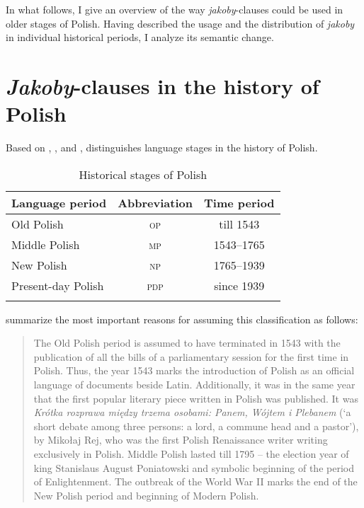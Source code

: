 \documentclass[output=paper]{langsci/langscibook}
\begin{document}
In what follows, I give an overview of the way \emph{jakoby}-clauses could be used in older stages of Polish. Having described the usage and the distribution of \emph{jakoby} in individual historical periods, I analyze its semantic change.

\section{\emph{Jakoby}-clauses in the history of Polish} \label{diachrony}\label{sec:jakoby:3}

Based on \textcite{Klemensiewicz2009}, \textcite{Walczak1999}, and \textcite{Dziubalska-Koaczyk-Walczak2010},  distinguishes language stages in the history of Polish.


\begin{table}[h]
\begin{tabular}{lcc}
\lsptoprule
Language period & Abbreviation & Time period  \\
\midrule
 Old Polish & \textsc{op} & till 1543 \\
 Middle Polish & \textsc{mp} & 1543--1765  \\
 New Polish & \textsc{np} & 1765--1939 \\
 Present-day Polish & \textsc{pdp} & since 1939 \\
\lspbottomrule
\end{tabular}
\caption{Historical stages of Polish\label{tab:jakoby:2}}
\end{table}

\textcite[823]{Dziubalska-Koaczyk-Walczak2010} summarize the most important reasons for assuming this classification as follows:

\begin{quote}
The Old Polish period is assumed to have terminated in 1543 with the publication of all the bills of a parliamentary session for the first time in Polish. Thus, the year 1543 marks the introduction of Polish as an official language of documents beside Latin. Additionally, it was in the same year that the first popular literary piece written in Polish was published. It was \emph{Krótka rozprawa między trzema osobami: Panem, Wójtem i Plebanem} (`a short debate among three persons: a lord, a commune head and a pastor'), by Mikołaj Rej, who was the first Polish Renaissance writer writing exclusively in Polish. Middle Polish lasted till 1795 -- the election year of king Stanislaus August Poniatowski and symbolic beginning of the period of Enlightenment. The outbreak of the World War II marks the end of the New Polish period and beginning of Modern Polish.
\end{quote}
\end{document}
